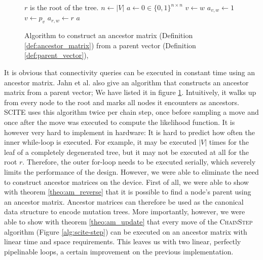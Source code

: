 \begin{figure}[p]
    \begin{algorithmic}[1]
         \Comment $r$ is the root of the tree.
            \State $n \leftarrow |V|$
            \State $a \leftarrow 0 \in \{0,1\}^{n \times n}$
                \State $v \leftarrow w$
                    \State $a_{v, w} \leftarrow 1$
                    \State $v \leftarrow p_v$
                \EndWhile
                \State $a_{r, w} \leftarrow r$
            \EndFor
            \State \Return $a$
        \EndFunction
    \end{algorithmic}
    \caption{Algorithm to construct an ancestor matrix (Definition \ref{def:ancestor_matrix}) from a parent vector (Definition \ref{def:parent_vector}), \cite{tree2016}}
    \label{alg:ancestor_matrix}
\end{figure}

It is obvious that connectivity queries can be executed in constant time using an ancestor matrix. Jahn et al. \cite{tree2016} also give an algorithm that constructs an ancestor matrix from a parent vector; We have listed it in figure \ref{alg:ancestor_matrix}. Intuitively, it walks up from every node to the root and marks all nodes it encounters as ancestors. \ac{SCITE} uses this algorithm twice per chain step, once before sampling a move and once after the move was executed to compute the likelihood function. It is however very hard to implement in hardware: It is hard to predict how often the inner while-loop is executed. For example, it may be executed $|V|$ times for the leaf of a completely degenerated tree, but it may not be executed at all for the root $r$. Therefore, the outer for-loop needs to be executed serially, which severely limits the performance of the design. However, we were able to eliminate the need to construct ancestor matrices on the device. First of all, we were able to show with theorem \ref{theo:am_reverse} that it is possible to find a node's parent using an ancestor matrix. Ancestor matrices can therefore be used as the canonical data structure to encode mutation trees. More importantly, however, we were able to show with theorem \ref{theo:am_update} that every move of the \textsc{ChainStep} algorithm (Figure \ref{alg:scite-step}) can be executed on an ancestor matrix with linear time and space requirements. This leaves us with two linear, perfectly pipelinable loops, a certain improvement on the previous implementation.

